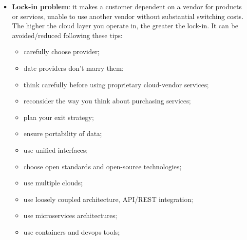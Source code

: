 \documentclass[oneside]{article}
\begin{document}
\begin{itemize}
    \item \textbf{Lock-in problem}: it makes a customer dependent on a vendor for products or services, unable to use another vendor without substantial switching costs. The higher the cloud layer you operate in, the greater the lock-in. It can be avoided/reduced following these tips:
        \begin{itemize}
            \item carefully choose provider;
            \item date providers don’t marry them;
            \item think carefully before using proprietary cloud-vendor services;
            \item reconsider the way you think about purchasing services;
            \item plan your exit strategy;
            \item ensure portability of data;
            \item use unified interfaces;
            \item choose open standards and open-source technologies;
            \item use multiple clouds;
            \item use loosely coupled architecture, API/REST integration;
            \item use microservices architectures;
            \item use containers and devops tools;
        \end{itemize}
\end{itemize}


\end{document}
